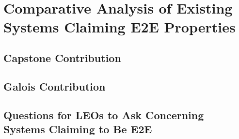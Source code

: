 \chapter{Comparative Analysis of Existing Systems Claiming E2E Properties}

\section{Capstone Contribution}


\section{Galois Contribution}

\section{Questions for LEOs to Ask Concerning Systems Claiming to Be E2E}

